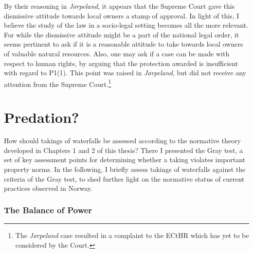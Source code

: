 By their reasoning in \emph{Jørpeland}, it appears that the Supreme Court gave this dismissive attitude towards local owners a stamp of approval. In light of this, I believe the study of the law in a socio-legal setting becomes all the more relevant. For while the dismissive attitude might be a part of the national legal order, it seems pertinent to ask if it is a reasonable attitude to take towards local owners of valuable natural resources. Also, one may ask if a case can be made with respect to human rights, by arguing that the protection awarded is insufficient with regard to P1(1). This point was raised in \emph{Jørpeland}, but did not receive any attention from the Supreme Court.\footnote{The {\it Jørpeland} case resulted in a complaint to the ECtHR which has yet to be considered by the Court.}

\section{Predation?}

How should takings of waterfalls be assessed according to the normative theory developed in Chapters 1 and 2 of this thesis? There I presented the Gray test, a set of key assessment points for determining whether a taking violates important property norms. In the following, I briefly assess takings of waterfalls against the criteria of the Gray test, to shed further light on the normative status of current practices observed in Norway.

\subsubsection{The Balance of Power}

